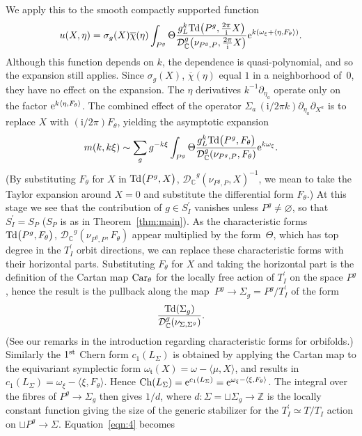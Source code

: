 \documentclass[pdftex]{sigma}
\numberwithin{equation}{section}
\newcommand{\pair}[2]{\langle #1, #2 \rangle}
\newcommand{\ol}[1]{\overline{#1}}
\newcommand{\tn}[1]{\textnormal{#1}}
\renewcommand{\i}{{\mathrm{i}}}
\def\t{\ensuremath{\mathfrak{t}}}
\def\bC{\ensuremath{\mathbb{C}}}
\def\bZ{\ensuremath{\mathbb{Z}}}
\def\Ch{\ensuremath{\textnormal{Ch}}}
\def\Td{\ensuremath{\textnormal{Td}}}
\def\calDC{\ensuremath{\mathcal{D}_{\bC}}}
\begin{document}
We apply this to the smooth compactly supported function
\[ u(X,\eta)=\sigma_g(X)\ol{\chi}(\eta) \int_{P^g} \Theta \frac{g_L^k\Td\big(P^g,\tfrac{2\pi}{\i}X\big)}{\calDC^g\big(\nu_{P^g,P},\tfrac{2\pi}{\i}X\big)}{\rm e}^{k(\omega_\xi+\pair{\eta}{F_\theta})}.\]
Although this function depends on $k$, the dependence is quasi-polynomial, and so the expansion still applies. Since $\sigma_g(X)$, $\ol{\chi}(\eta)$ equal $1$ in a neighborhood of~$0$, they have no effect on the expansion. The $\eta$ derivatives $k^{-1}\partial_{\eta_a}$ operate only on the factor ${\rm e}^{k\pair{\eta}{F_\theta}}$. The combined effect of the operator $\Sigma_a\,(\i/2\pi k)\partial_{\eta_a}\partial_{X^a}$ is to replace $X$ with $(\i/2\pi)F_\theta$, yielding the asymptotic expansion
\begin{gather}\label{eqn:4}
m(k,k\xi)\sim \sum_g g^{-k\xi} \int_{P^g} \Theta \frac{g_L^k\Td\big(P^g,F_\theta\big)}{\calDC^g(\nu_{P^g,P},F_\theta)}{\rm e}^{k\omega_\xi}.
\end{gather}
(By substituting $F_\theta$ for $X$ in $\Td\big(P^g,X\big)$, $\calDC^g(\nu_{P^g,P},X)^{-1}$, we mean to take the Taylor expansion around $X=0$ and substitute the differential form $F_\theta$.) At this stage we see that the contribution of $g \in S_I^\prime$ vanishes unless $P^g \ne \varnothing$, so that $S_I^\prime = S_P$ ($S_P$ is as in Theorem~\ref{thm:main}). As the characteristic forms $\Td\big(P^g,F_\theta\big)$, $\calDC^g(\nu_{P^g,P},F_\theta)$ appear multiplied by the form~$\Theta$, which has top degree in the $T_I^\prime$ orbit directions, we can replace these characteristic forms with their horizontal parts. Substituting $F_\theta$ for $X$ and taking the horizontal part is the definition of the Cartan map $\tn{Car}_\theta$ for the locally free action of $T_I^\prime$ on the space $P^g$, hence the result is the pullback along the map~$P^g \rightarrow \Sigma_g=P^g/T_I^\prime$ of the form
\[ \frac{\Td(\Sigma_g)}{\calDC^g(\nu_{\Sigma,\Sigma^g})}. \]
(See our remarks in the introduction regarding characteristic forms for orbifolds.) Similarly the $1^{\rm st}$ Chern form $c_1(L_\Sigma)$ is obtained by applying the Cartan map to the equivariant symplectic form $\omega_\t(X)=\omega-\pair{\mu}{X}$, and results in $c_1(L_\Sigma)=\omega_\xi-\pair{\xi}{F_\theta}$. Hence $\Ch(L_\Sigma)={\rm e}^{c_1(L_\Sigma)}={\rm e}^{\omega_\xi-\pair{\xi}{F_\theta}}$. The integral over the fibres of $P^g \rightarrow \Sigma_g$ then gives $1/d$, where $d \colon \Sigma=\sqcup \Sigma_g \rightarrow \bZ$ is the locally constant function giving the size of the generic stabilizer for the $T_I^\prime \simeq T/T_I$ action on $\sqcup P^g \rightarrow \Sigma$. Equation~\eqref{eqn:4} becomes
\end{document}
